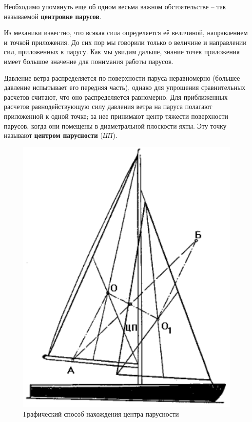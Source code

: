 \documentclass[a4paper, 12pt, twoside, final]{scrbook}
\begin{document}
Необходимо упомянуть еще об одном весьма важном обстоятельстве \--- так называемой \textbf{центровке парусов}.

Из механики известно, что всякая сила определяется её величиной, направлением и точкой приложения. До сих пор мы говорили только о величине и направлении сил, приложенных к парусу. Как мы увидим дальше, знание точек приложения имеет большое значение для понимания работы парусов.

Давление ветра распределяется по поверхности паруса неравномерно (большее давление испытывает его передняя часть), однако для упрощения сравнительных расчетов считают, что оно распределяется равномерно. Для приближенных расчетов равнодействующую силу давления ветра на паруса полагают приложенной к одной точке; за нее принимают центр тяжести поверхности парусов, когда они помещены в диаметральной плоскости яхты. Эту точку называют \textbf{центром парусности} (\textit{ЦП}).

\begin{figure}[htbp]
   \centering
   \includegraphics{pics/98_Graf_sposob_centr_parusn} %
   \caption{Графический способ нахождения центра парусности}
   \label{fig:98}
\end{figure}
\end{document}
